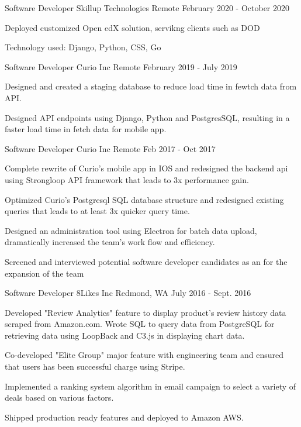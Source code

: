 \begin{cventries}
\cventry
{Software Developer}
{Skillup Technologies}
{Remote}
{February 2020 - October 2020}
{
\begin{cvitems}
\item {Deployed customized Open edX solution, servikng clients such as DOD}
\item {Technology used: Django, Python, CSS, Go}
\end{cvitems}
}
 
\cventry
{Software Developer}
{Curio Inc}
{Remote}
{February 2019 - July 2019}
{
\begin{cvitems}
\item {Designed and created a staging database to reduce load time in fewtch data from API.}
\item {Designed API endpoints using Django, Python and PostgresSQL, resulting in a faster load time in fetch data for mobile app.}
\end{cvitems}
}


\cventry
{Software Developer} %
{Curio Inc} %
{Remote} %
{Feb 2017 - Oct 2017} %
{ %
\begin{cvitems}
\item {Complete rewrite of Curio's mobile app in IOS and redesigned the backend api using Strongloop API framework that leads to 3x performance gain.}
\item {Optimized Curio's Postgresql SQL database structure and redesigned existing queries that leads to at least 3x quicker query time. }
\item {Designed an administration tool using Electron for batch data upload, dramatically increased the team's work flow and efficiency.}
\item {Screened and interviewed potential software developer candidates as an for the expansion of the team}  
\end{cvitems}
}

\cventry
{Software Developer} %
{8Likes Inc} %
{Redmond, WA} %
{July 2016 - Sept. 2016} %
{ %
\begin{cvitems}
\item {Developed "Review Analytics" feature to display product's review history data scraped from Amazon.com. Wrote SQL to query data from PostgreSQL for retrieving data using LoopBack and C3.js in displaying chart data. }
\item {Co-developed "Elite Group" major feature with engineering team and ensured that users has been successful charge using Stripe.}
\item {Implemented a ranking system algorithm in email campaign to select a variety of deals based on various factors.}
\item {Shipped production ready features and deployed to Amazon AWS.}  
\end{cvitems}
}



\end{cventries}
